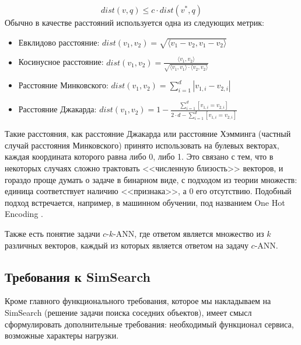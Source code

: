 \documentclass[a4paper,12pt]{extarticle}
\begin{document}
$$dist(v, q) \le c \cdot dist(v^*, q)$$
\newpage
Обычно в качестве расстояний используется одна из следующих метрик:
\label{DIST}
\begin{itemize}

\item Евклидово расстояние: $dist(v_1, v_2) = \sqrt{\langle v_1 - v_2,v_1 - v_2\rangle}$
\item Косинусное расстояние: $dist(v_1, v_2) = \frac{\langle v_1, v_2\rangle}{\sqrt{\langle v_1, v_1\rangle \cdot \langle v_2,v_2\rangle}}$
\item Расстояние Минковского: $dist(v_1, v_2) = \displaystyle \sum_{i = 1}^d |v_{1, i} - v_{2, i}|$
\item Расстояние Джакарда: $dist(v_1, v_2) = 1 - \frac{\displaystyle \sum_{i = 1}^d [v_{1, i} = v_{2, i}]}{2 \cdot d - \displaystyle \sum_{i = 1}^d [v_{1, i} = v_{2, i}]}$

\end{itemize}

Такие расстояния, как расстояние Джакарда или расстояние Хэмминга (частный случай расстояния Минковского) принято использовать на булевых векторах, каждая координата которого равна либо 0, либо 1. Это связано с тем, что в некоторых случаях сложно трактовать <<численную близость>> векторов, и гораздо проще думать о задаче в бинарном виде, с подходом из теории множеств: единица соответствует наличию <<признака>>, а 0 его отсутствию. Подобный подход встречается, например, в машинном обучении, под названием One Hot Encoding \cite{ohe}.

Также есть понятие задачи $c$-$k$-ANN, где ответом является множество из $k$ различных векторов, каждый из которых является ответом на задачу $c$-ANN.

\subsection{Требования к SimSearch}

Кроме главного функционального требования, которое мы накладываем на SimSearch (решение задачи поиска соседних объектов), имеет смысл сформулировать дополнительные требования: необходимый функционал сервиса, возможные характеры нагрузки.
\end{document}
